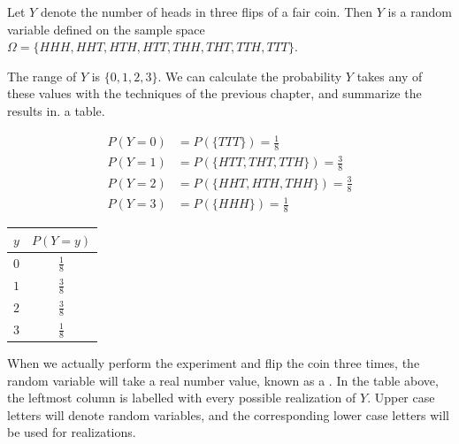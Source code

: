 \begin{example} Let $Y$ denote the number of heads in three flips of a fair coin. Then $Y$ is a random variable defined on the sample space $\Omega = \{HHH, HHT, HTH, HTT, THH, THT, TTH, TTT\}$.

The range of $Y$ is $\{0,1,2,3\}$. We can calculate the probability $Y$ takes any of these values with the techniques of the previous chapter, and summarize the results in. a table.
\begin{center}
\begin{minipage}{0.4\textwidth}
$$\begin{aligned}P(Y = 0) &= P(\{TTT\}) = \textstyle\frac{1}{8} \\
P(Y = 1) &= P(\{HTT, THT, TTH\}) = \textstyle\frac{3}{8} \\
P(Y = 2) &= P(\{HHT, HTH, THH\}) = \textstyle\frac{3}{8} \\
P(Y = 3) &= P(\{HHH\}) = \textstyle\frac{1}{8}\end{aligned}$$
\end{minipage}\begin{minipage}{0.4\textwidth}
\renewcommand*{\arraystretch}{1.35}
\begin{center}
\begin{tabular}{c|c}
$y$ & $P(Y = y)$ \\
\hline
$0$ & $\frac{1}{8}$ \\
$1$ & $\frac{3}{8}$ \\
$2$ & $\frac{3}{8}$ \\
$3$ & $\frac{1}{8}$ \\
\end{tabular}
\end{center}
\renewcommand*{\arraystretch}{1}
\end{minipage}
\end{center}
\end{example}
\begin{keypoint}
When we actually perform the experiment and flip the coin three times, the random variable will take a real number value, known as a . In the table above, the leftmost column is labelled with every possible realization of $Y$. Upper case letters will denote random variables, and the corresponding lower case letters will be used for realizations.
\end{keypoint}


